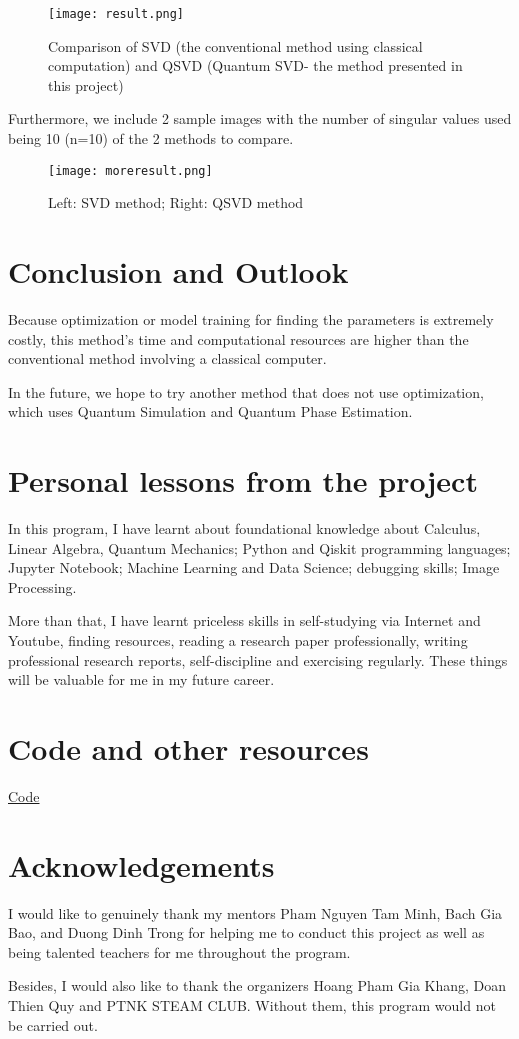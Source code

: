 \documentclass{article}
\begin{document}
\begin{figure}
\centering
\texttt{[image: result.png]}
\caption{Comparison of SVD (the conventional method using classical computation) and QSVD (Quantum SVD- the method presented in this project) }
\end{figure}

Furthermore, we include 2 sample images with the number of singular values used being 10 (n=10) of the 2 methods to compare. 

\begin{figure}[htp!]
\centering
\texttt{[image: moreresult.png]}
\caption{Left: SVD method; Right: QSVD method}
\end{figure}



\section{Conclusion and Outlook}
Because optimization or model training for finding the parameters is extremely costly, this method's time and computational resources are higher than the conventional method involving a classical computer. 

In the future, we hope to try another method that does not use optimization, which uses Quantum Simulation and Quantum Phase Estimation. 

\section{Personal lessons from the project}
In this program, I have learnt about foundational knowledge about Calculus, Linear Algebra, Quantum Mechanics; Python and Qiskit programming languages; Jupyter Notebook; Machine Learning and Data Science; debugging skills; Image Processing.

More than that, I have learnt priceless skills in self-studying via Internet and Youtube, finding resources, reading a research paper professionally, writing professional research reports, self-discipline and exercising regularly. These things will be valuable for me in my future career.

\section{Code and other resources}
\href{https://github.com/prohack17/quantum}{Code}

\section{Acknowledgements}
I would like to genuinely thank my mentors Pham Nguyen Tam Minh, Bach Gia Bao, and Duong Dinh Trong for helping me to conduct this project as well as being talented teachers for me throughout the program. 

Besides, I would also like to thank the organizers Hoang Pham Gia Khang, Doan Thien Quy and PTNK STEAM CLUB. Without them, this program would not be carried out.
\end{document}
